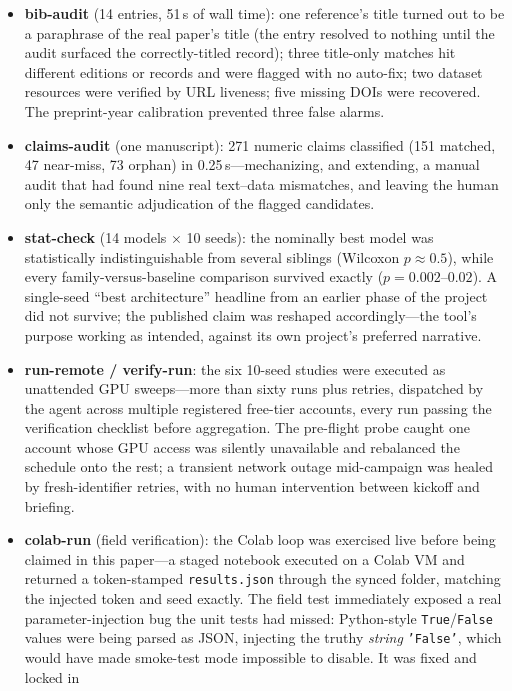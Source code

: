 \documentclass[11pt]{article}
\begin{document}
\begin{itemize}
\item \textbf{bib-audit} (14 entries, 51\,s of wall time): one reference's title turned out to be
a paraphrase of the real paper's title (the entry resolved to nothing until
the audit surfaced the correctly-titled record); three title-only matches hit
different editions or records and were flagged with no auto-fix; two dataset
resources were verified by URL liveness; five missing DOIs were recovered.
The preprint-year calibration prevented three false alarms.
\item \textbf{claims-audit} (one manuscript): 271 numeric claims classified
(151 matched, 47 near-miss, 73 orphan) in 0.25\,s---mechanizing, and
extending, a manual audit that had found nine real text--data mismatches, and
leaving the human only the semantic adjudication of the flagged candidates.
\item \textbf{stat-check} (14 models $\times$ 10 seeds): the nominally best
model was statistically indistinguishable from several siblings (Wilcoxon
$p\approx0.5$), while every family-versus-baseline comparison survived exactly
($p=0.002$--$0.02$). A single-seed ``best architecture'' headline from an
earlier phase of the project did not survive; the published claim was reshaped
accordingly---the tool's purpose working as intended, against its own
project's preferred narrative.
\item \textbf{run-remote / verify-run}: the six 10-seed studies were executed
as unattended GPU sweeps---more than sixty runs plus retries, dispatched by
the agent across multiple registered free-tier accounts, every run passing
the verification checklist before aggregation. The pre-flight probe caught
one account whose GPU access was silently unavailable and rebalanced the
schedule onto the rest; a transient network outage mid-campaign was healed by
fresh-identifier retries, with no human intervention between kickoff and
briefing.
\item \textbf{colab-run} (field verification): the Colab loop was exercised
live before being claimed in this paper---a staged notebook executed on a
Colab VM and returned a token-stamped \texttt{results.json} through the
synced folder, matching the injected token and seed exactly. The field test
immediately exposed a real parameter-injection bug the unit tests had
missed: Python-style \texttt{True}/\texttt{False} values were being parsed
as JSON, injecting the truthy \emph{string} \texttt{'False'}, which would
have made smoke-test mode impossible to disable. It was fixed and locked in

\end{itemize}
\end{document}
